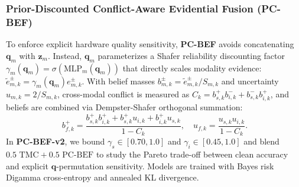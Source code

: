 \documentclass[preprint,12pt]{elsarticle}
\begin{document}
\subsubsection{Prior-Discounted Conflict-Aware Evidential Fusion (PC-BEF)}
To enforce explicit hardware quality sensitivity, \textbf{PC-BEF} avoids concatenating $\bm{q}_m$ with $\bm{z}_m$. Instead, $\bm{q}_m$ parameterizes a Shafer reliability discounting factor $\gamma_m(\bm{q}_m) = \sigma(\text{MLP}_m(\bm{q}_m))$ that directly scales modality evidence: $\tilde{e}_{m,k}^\pm = \gamma_m(\bm{q}_m) e_{m,k}^\pm$. With belief masses $b_{m,k}^\pm = \tilde{e}_{m,k}^\pm / S_{m,k}$ and uncertainty $u_{m,k} = 2 / S_{m,k}$, cross-modal conflict is measured as $C_k = b_{s,k}^+ b_{i,k}^- + b_{s,k}^- b_{i,k}^+$, and beliefs are combined via Dempster-Shafer orthogonal summation:
\begin{equation}
    b_{f,k}^+ = \frac{b_{s,k}^+ b_{i,k}^+ + b_{s,k}^+ u_{i,k} + b_{i,k}^+ u_{s,k}}{1 - C_k}, \quad u_{f,k} = \frac{u_{s,k} u_{i,k}}{1 - C_k}.
\end{equation}
In \textbf{PC-BEF-v2}, we bound $\gamma_s \in [0.70, 1.0]$ and $\gamma_i \in [0.45, 1.0]$ and blend $0.5\text{ TMC} + 0.5\text{ PC-BEF}$ to study the Pareto trade-off between clean accuracy and explicit $\bm{q}$-permutation sensitivity. Models are trained with Bayes risk Digamma cross-entropy and annealed KL divergence.
\end{document}
